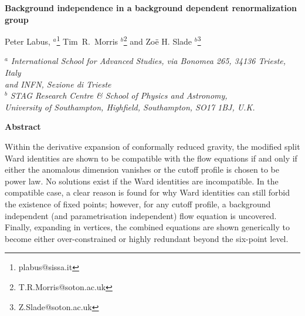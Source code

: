 \documentclass[11pt,a4paper]{article}
\numberwithin{figure}{section}
\numberwithin{equation}{section}
\begin{document}
\vspace*{2cm}
\begin{center}
{\huge \bf Background independence in a background dependent renormalization group}
\vspace*{0.1cm}
%
\vskip 1cm

\renewcommand{\thefootnote}{\fnsymbol{footnote}}
\setcounter{footnote}{1}

{\large  Peter Labus, $^a$\footnote{plabus@sissa.it} Tim\ R.\ Morris $^b$\footnote{T.R.Morris@soton.ac.uk} and Zo\"e H. Slade $^b$\footnote{Z.Slade@soton.ac.uk}} 
%
\vskip 8pt

{$^a$ \it International School for Advanced Studies, via Bonomea 265, 34136 Trieste, Italy \\
              and INFN, Sezione di Trieste}\\
{$^b$  \it STAG Research Centre \& School of Physics and Astronomy,\\
University of Southampton,
              Highfield, Southampton, SO17 1BJ, U.K.}\\

\vspace*{0.5cm}

\end{center}


\begin{center}
{\large \bf Abstract}

\vspace{.6cm}

\parbox{14cm}{
Within the derivative expansion of conformally reduced gravity, the modified split Ward identities are shown to be compatible with the flow equations if and only if either the anomalous dimension vanishes or the cutoff profile is chosen to be power law. No solutions exist if the Ward identities are incompatible. In the compatible case, a clear reason is found for why Ward identities can still forbid the existence of fixed points; however, for any cutoff profile, a background independent (and parametrisation independent) flow equation is uncovered. Finally, expanding in vertices, the combined equations are shown generically to become either over-constrained or highly redundant beyond the six-point level.
}

\end{center}

\vspace{2cm}
\end{document}
